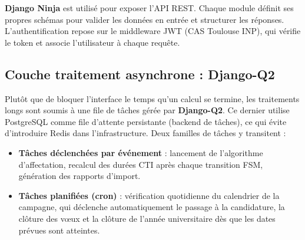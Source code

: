 
\textbf{Django Ninja} est utilisé pour exposer l'API REST. Chaque module définit ses propres schémas pour valider les données en entrée et structurer les réponses. L’authentification repose sur le middleware JWT (CAS Toulouse INP), qui vérifie le token et associe l’utilisateur à chaque requête.

\subsection{Couche traitement asynchrone : Django-Q2}

Plutôt que de bloquer l'interface le temps qu'un calcul se termine, les traitements longs sont soumis à une file de tâches gérée par \textbf{Django-Q2}. Ce dernier utilise PostgreSQL comme file d'attente persistante (backend de tâches), ce qui évite d'introduire Redis dans l'infrastructure. Deux familles de tâches y transitent :

\begin{itemize}
  \item \textbf{Tâches déclenchées par événement} : lancement de l'algorithme d'affectation, recalcul des durées CTI après chaque transition FSM, génération des rapports d'import.
  \item \textbf{Tâches planifiées (cron)} : vérification quotidienne du calendrier de la campagne, qui déclenche automatiquement le passage à la candidature, la clôture des vœux et la clôture de l'année universitaire dès que les dates prévues sont atteintes.
\end{itemize}

